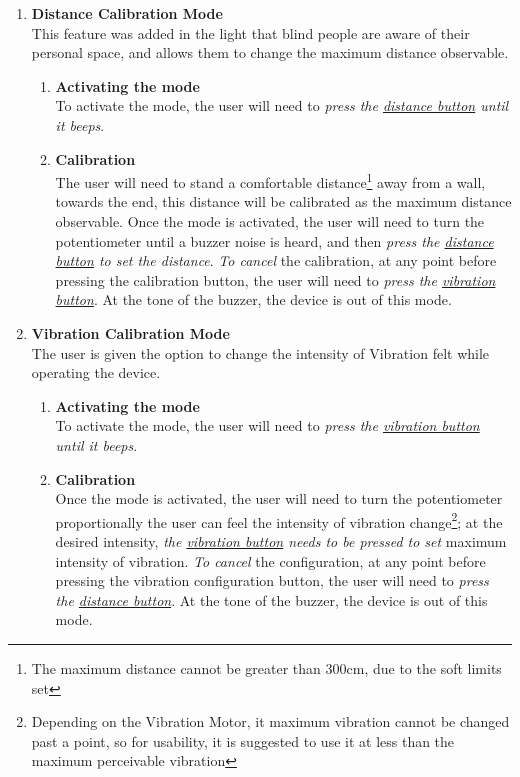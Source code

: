 \documentclass[twoside,11pt,letter]{article}
\begin{document}
\begin{enumerate}

    \item \large{\textbf{Distance Calibration Mode}}\\
    This feature was added in the light that blind people are aware of their personal space, and allows them to change the maximum distance observable.
    \begin{enumerate}
        \item \textbf{Activating the mode}\\ To activate the mode, the user will need to \textit{press the \underline{distance button} until it beeps}.\\
        \item \textbf{Calibration}\\ The user will need to stand a comfortable distance\footnote{The maximum distance cannot be greater than 300cm, due to the soft limits set} away from a wall, towards the end, this distance will be calibrated as the maximum distance observable. Once the mode is activated, the user will need to turn the potentiometer until a buzzer noise is heard, and then \textit{press the \underline{distance button} to set the distance}. \textit{To cancel} the calibration, at any point before pressing the calibration button, the user will need to \textit{press the \underline{vibration button}}. At the tone of the buzzer, the device is out of this mode. 
    \end{enumerate}
    
    \item \large{\textbf{Vibration Calibration Mode}}\\
    The user is given the option to change the intensity of Vibration felt while operating the device.
    \begin{enumerate}
        \item \textbf{Activating the mode}\\ To activate the mode, the user will need to \textit{press the \underline{vibration button} until it beeps}.\\
        \item \textbf{Calibration}\\ Once the mode is activated, the user will need to turn the potentiometer proportionally the user can feel the intensity of vibration change\footnote{Depending on the Vibration Motor, it maximum vibration cannot be changed past a point, so for usability, it is suggested to use it at less than the maximum perceivable vibration}; at the desired intensity, \textit{the \underline{vibration button} needs to be pressed to set} maximum intensity of vibration. \textit{To cancel} the configuration, at any point before pressing the vibration configuration button, the user will need to \textit{press the \underline{distance button}}. At the tone of the buzzer, the device is out of this mode.
    \end{enumerate}
    

\end{enumerate}
\end{document}
